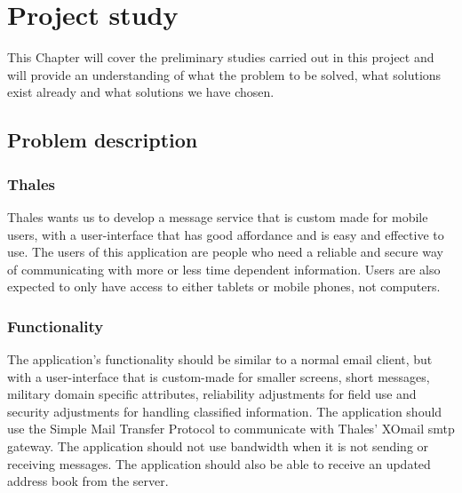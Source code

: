 \chapter{Project study}

This Chapter will cover the preliminary studies carried out in this project and will provide an understanding of what the problem to be solved, what solutions exist already and what solutions we have chosen.

\section{Problem description}

\subsection{Thales}
Thales wants us to develop a message service that is custom made for mobile users, with a user-interface that has good affordance and is easy and effective to use.
\newline
\newline
The users of this application are people who need a reliable and secure way of communicating with more or less time dependent information. Users are also expected to only have access to either tablets or mobile phones, not computers.

\subsection{Functionality}
The application's functionality should be similar to a normal email client, but with a user-interface that is custom-made for smaller screens, short messages, military domain specific  attributes, reliability adjustments for field use and security adjustments for handling classified information. The application should use the Simple Mail Transfer Protocol to communicate with Thales' XOmail \gls{smtp} gateway.
\newline
\newline
The application should not use bandwidth when it is not sending or receiving messages. The application should also be able to receive an updated address book from the server.

\newpage

